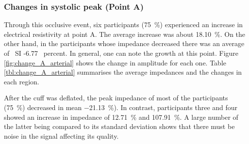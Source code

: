 \subsubsection{Changes in systolic peak (Point A)}
\label{section apa 3.2.1}
Through this occlusive event, six participants (\SI{75}{\percent}) experienced an increase in electrical resistivity at point A. The average increase was about \SI{18.10}{\percent}.  On the other hand, in the participants whose impedance decreased there was an average of \ SI {-6.77} {\ percent}. In general, one can note the growth at this point. Figure \ref{fig:change_A_arterial} shows the change in amplitude for each one. Table \ref{tbl:change_A_arterial} summarises the average impedances and the changes in each region. 

After the cuff was deflated, the peak impedance of most of the participants (\SI{75}{\percent})  decreased in mean \SI{-21.13}{\percent}).  In contrast, participants three and four showed an increase in impedance of \SI{12.71}{\percent} and \SI{107.91}{\percent}. A large number of the latter being compared to its standard deviation shows that there must be noise in the signal affecting its quality.   

